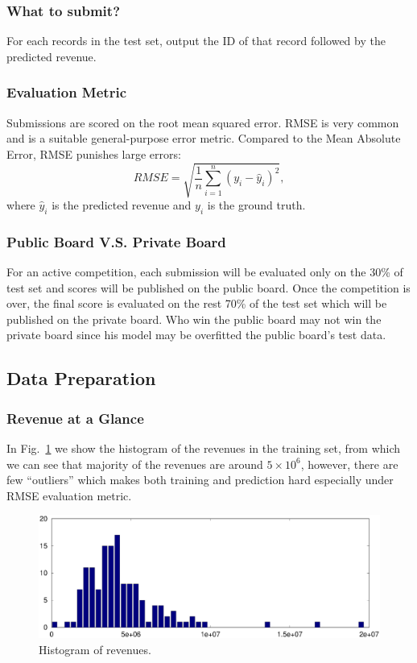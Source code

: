 \documentclass[11pt, oneside]{article}   	%
\newcommand\figref{Fig.~\ref}
\begin{document}
\subsubsection{What to submit?}
For each records in the test set, output the ID of that record followed by the predicted revenue.

\subsubsection{Evaluation Metric}
Submissions are scored on the root mean squared error. 
RMSE is very common and is a suitable general-purpose error metric. 
Compared to the Mean Absolute Error, RMSE punishes large errors:
\begin{equation*}
RMSE = \sqrt{\frac{1}{n} \sum_{i=1}^{n} (y_i - \hat{y}_i)^2 }, 
\end{equation*}
where $\hat{y}_i$ is the predicted revenue and $y_i$ is the ground truth.

\subsubsection{Public Board V.S. Private Board}
For an active competition, each submission will be evaluated only on the 30\% of test set and scores will be published on the public board.
Once the competition is over, the final score is evaluated on the rest 70\% of the test set which will be published on the private board. 
Who win the public board may not win the private board since his model may be overfitted the public board's test data.
   
\subsection{Data Preparation}
\subsubsection{Revenue at a Glance}
In \figref{fig:revenue} we show the histogram of the revenues in the training set, from which we can see that majority of the revenues are around $5 \times 10^6$, 
however, there are few ``outliers'' which makes both training and prediction hard especially under RMSE evaluation metric.

\begin{figure}[htbp] %
   \centering
   \includegraphics[width=5in]{figs/revenue.eps} 
   \caption{Histogram of revenues.}
   \label{fig:revenue}
\end{figure}
\end{document}
